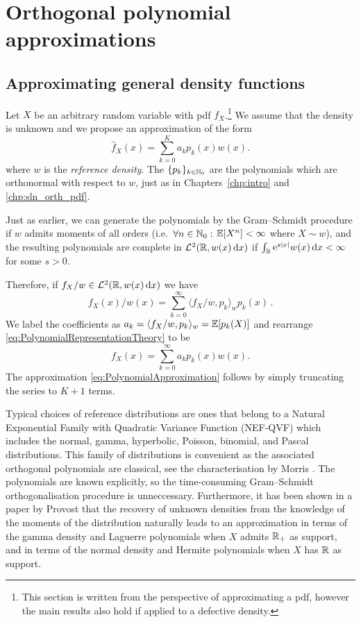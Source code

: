 \section{Orthogonal polynomial approximations}\label{sec:PolynomialApproximation}


\subsection{Approximating general density functions} \label{ssec:PolynomialApproxIntro}

Let $X$ be an arbitrary random variable with pdf $f_X$.\footnote{This section is written from the perspective of approximating a pdf, however the main results also hold if applied to a defective density.} We assume that the density is unknown and we propose an approximation of the form
\begin{equation}\label{eq:PolynomialApproximation}
\widehat{f}_{X}(x)=\sum_{k=0}^{K}a_{k}p_{k}(x)w(x).
\end{equation}
where $w$ is the \emph{reference density}. The $\{p_{k}\}_{k\in\mathbb{N}_0}$ are the polynomials which are orthonormal with respect to $w$, just as in Chapters~\ref{chp:intro} and \ref{chp:sln_orth_pdf}.

Just as earlier, we can generate the polynomials by the Gram--Schmidt procedure if $w$ admits moments of all orders (i.e.\ $\forall n \in \mathbb{N}_0 :$ $\operatorname{{\mathbb E}}[X^n] < \infty$ where $X \sim w$), and the resulting polynomials are complete in $\mathcal{L}^2(\mathbb{R}, w(x) \mathop{}\!\mathrm{d} x)$ if $\int_{\mathbb{R}} \mathrm{e}^{s\lvert x\rvert} w(x) \mathop{}\!\mathrm{d} x < \infty$ for some $s>0$.

Therefore, if $f_{X}/w\in \mathcal{L}^2(\mathbb{R}, w(x) \mathop{}\!\mathrm{d} x)$ we have
\begin{equation}\label{eq:PolynomialRepresentationTheory}
f_{X}(x)/w(x)=\sum_{k=0}^{\infty} \langle f_X / w, p_k \rangle_w p_k(x) \,.
\end{equation}
We label the coefficients as $a_k = \langle f_X / w, p_k \rangle_w = \operatorname{{\mathbb E}}[p_k(X)]$
and rearrange \eqref{eq:PolynomialRepresentationTheory} to be
\begin{equation}\label{eq:PolynomialRepresentation}
f_{X}(x)=\sum_{k=0}^{\infty} a_k p_{k}(x) w(x).
\end{equation}
The approximation \eqref{eq:PolynomialApproximation} follows by simply truncating the series to $K+1$ terms.

Typical choices of reference distributions are ones that belong to a Natural Exponential Family with Quadratic Variance Function (NEF-QVF) which includes the normal, gamma, hyperbolic, Poisson, binomial, and Pascal distributions.
This family of distributions is convenient as the associated orthogonal polynomials are classical, see the characterisation by Morris \cite{Mo82}. The polynomials are known explicitly, so the time-consuming Gram--Schmidt orthogonalisation procedure is unneccessary. Furthermore, it has been shown in a paper by Provost \cite{Pr05} that the recovery of unknown densities from the knowledge of the moments of the distribution naturally leads to an approximation in terms of the gamma density and Laguerre polynomials when $X$ admits $\mathbb{R}_{+}$ as support, and in terms of the normal density and Hermite polynomials when $X$ has $\mathbb{R}$ as support.

